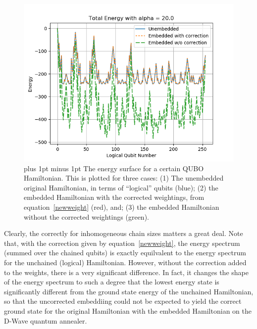 \documentclass[preprint,12pt,eqsecnum,nofootinbib,amsmath,amssymb]{revtex4}
\newcommand{\bibskip}{\baselineskip16pt plus 1pt minus 1pt}
\newcommand{\footnoteskip}{\baselineskip 12pt plus 1pt minus 1pt}
\begin{document}
%
\begin{figure}[h!]
\includegraphics[scale=0.8]{figs/energy.png} 
\caption{\footnoteskip  
%
  The energy surface for a certain QUBO Hamiltonian. This is plotted for three cases:  (1) The unembedded original Hamiltonian,
  in terms of ``logical'' qubits (blue); (2) the embedded Hamiltonian with the corrected weightings, from equation~\ref{newweight} (red),
  and; (3) the embedded Hamiltonian without the corrected weightings (green).
%
}
\label{fig_energy}
\end{figure} 
%
Clearly, the correctly for inhomogeneous chain sizes matters a great deal. Note that, with the correction given by equation~\ref{newweight},
the energy spectrum (summed over the chained qubits) is exactly equilvalent to the energy spectrum for the unchained (logical) Hamiltonian.
However, without the correction added to the weights, there is a very significant difference. In fact, it changes the shape of the energy spectrum
to such a degree that the lowest energy state is significantly different from the ground state energy of the unchained Hamiltonian, so that the
uncorrected embeddiing could not be expected to yield the correct ground state for the original Hamiltonian with the embedded Hamiltonian on the
D-Wave quantum annealer.



\end{document}
